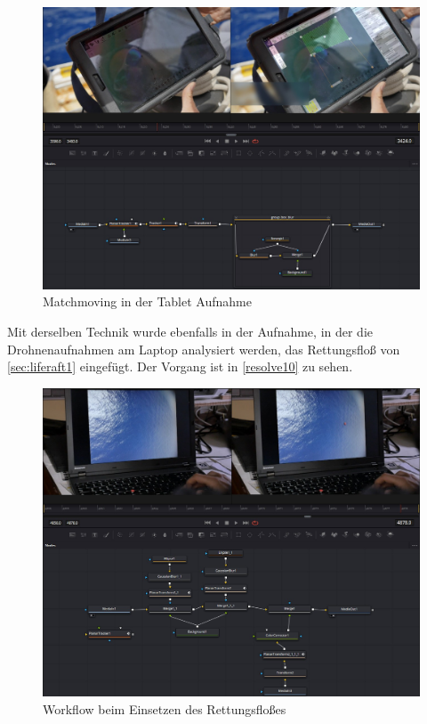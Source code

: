 \begin{figure}[H]
\begin{center}
\includegraphics[width=\textwidth]{gfx/post/resolve8.jpg}
\caption{Matchmoving in der Tablet Aufnahme}
\label{resolve8}
\end{center}
\end{figure}

\label{sec:liferaft2}
Mit derselben Technik wurde ebenfalls in der Aufnahme, in der die Drohnenaufnahmen am Laptop analysiert werden, das Rettungsfloß von \autoref{sec:liferaft1} eingefügt. Der Vorgang ist in \autoref{resolve10} zu sehen.

\begin{figure}[H]
\begin{center}
\includegraphics[width=\textwidth]{gfx/post/resolve5.jpg}
\caption{Workflow beim Einsetzen des Rettungsfloßes}
\label{resolve10}
\end{center}
\end{figure}

